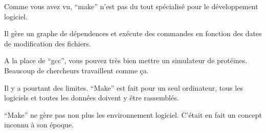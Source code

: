 \documentclass[12pt]{article}
\begin{document}
\newpage

Comme vous avez vu, ``make'' n'est pas du tout spécialisé pour le
développement logiciel.

Il gère un graphe de dépendences et exécute des commandes en fonction
des dates de modification des fichiers.

A la place de ``gcc'', vous pouvez très bien mettre un simulateur de
protéines. Beaucoup de chercheurs travaillent comme ça.

Il y a pourtant des limites. ``Make'' est fait pour un seul ordinateur,
tous les logiciels et toutes les données doivent y être rassemblés.

``Make'' ne gère pas non plus les environnement logiciel. C'était
en fait un concept inconnu à son époque.
\end{document}
